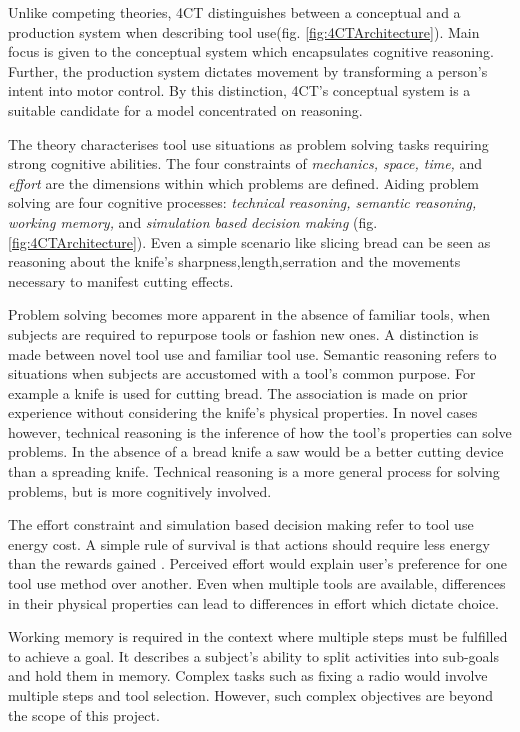 \documentclass[11]{article}
\begin{document}
Unlike competing theories, 4CT distinguishes between a conceptual and a production system when describing tool use(fig. \ref{fig:4CTArchitecture}).
Main focus is given to the conceptual system which encapsulates cognitive reasoning.
Further, the production system dictates movement by transforming a person's intent into motor control. 
By this distinction, 4CT's conceptual system is a suitable candidate for a model concentrated on reasoning.


The theory characterises tool use situations as problem solving tasks requiring strong cognitive abilities. 
The four constraints of \emph{mechanics, space, time,} and \emph{effort} are the dimensions within which problems are defined.
Aiding problem solving are four cognitive processes: \emph{technical reasoning, semantic reasoning, working memory,} and \emph{simulation based decision making} (fig. \ref{fig:4CTArchitecture}).  
Even a simple scenario like slicing bread can be seen as reasoning about the knife's sharpness,length,serration and the movements necessary to manifest cutting effects. 

Problem solving becomes more apparent in the absence of familiar tools, when subjects are required to repurpose tools or fashion new ones.
A distinction is made between novel tool use and familiar tool use. 
Semantic reasoning refers to situations when subjects are accustomed with a tool's common purpose. 
For example a knife is used for cutting bread. 
The association is made on prior experience without considering the knife's physical properties.  
In novel cases however, technical reasoning is the inference of how the tool's properties can solve problems.
In the absence of a bread knife a saw would be a better cutting device than a spreading knife. 
Technical reasoning is a more general process for solving problems, but is more cognitively involved.  

The effort constraint and simulation based decision making refer to tool use energy cost. 
A simple rule of survival is that actions should require less energy than the rewards gained \cite{proffitt2006}.
Perceived effort would explain user's preference for one tool use method over another. 
Even when multiple tools are available, differences in their physical properties can lead to differences in effort which dictate choice. 

Working memory is required in the context where multiple steps must be fulfilled to achieve a goal. 
It describes a subject's ability to split activities into sub-goals and hold them in memory. 
Complex tasks such as fixing a radio would involve multiple steps and tool selection. 
However, such complex objectives are beyond the scope of this project.
\end{document}
